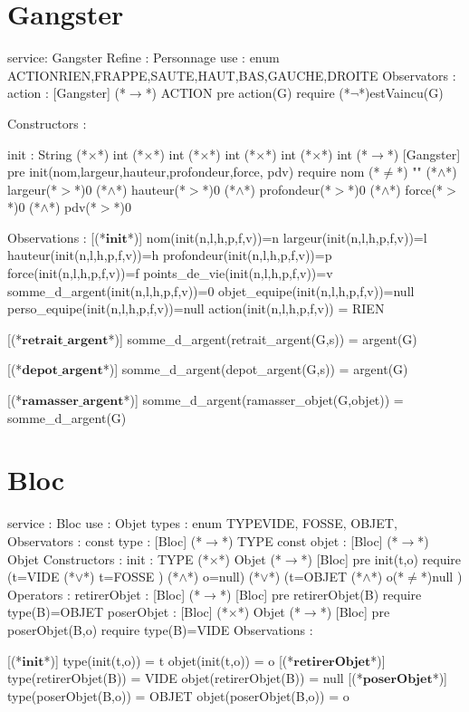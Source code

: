 \documentclass[a4paper, 11pt]{report}
\newcommand{\specB}[1]{\textbf{#1}}
\begin{document}
\section{Gangster}
\begin{Spe}
service: Gangster
Refine : Personnage
use : enum ACTION{RIEN,FRAPPE,SAUTE,HAUT,BAS,GAUCHE,DROITE}
Observators :
	action : [Gangster]  (*$\rightarrow$*) ACTION
		pre action(G) require (*$\lnot$*)estVaincu(G)
		
Constructors : 

	init : String (*$\times$*) int (*$\times$*) int (*$\times$*) int (*$\times$*) int (*$\times$*) int  (*$\rightarrow$*) [Gangster]
		pre init(nom,largeur,hauteur,profondeur,force, pdv) require nom (*$\neq$*) "" (*$\land$*) largeur(*$>$*)0 (*$\land$*) hauteur(*$>$*)0 (*$\land$*) profondeur(*$>$*)0 (*$\land$*) force(*$>$*)0 (*$\land$*) pdv(*$>$*)0 
		
Observations :
	[(*$\specB{init}$*)]
		nom(init(n,l,h,p,f,v))=n
		largeur(init(n,l,h,p,f,v))=l
		hauteur(init(n,l,h,p,f,v))=h
		profondeur(init(n,l,h,p,f,v))=p
		force(init(n,l,h,p,f,v))=f
		points_de_vie(init(n,l,h,p,f,v))=v
		somme_d_argent(init(n,l,h,p,f,v))=0
		objet_equipe(init(n,l,h,p,f,v))=null
		perso_equipe(init(n,l,h,p,f,v))=null
		action(init(n,l,h,p,f,v)) = RIEN
		
	[(*$\specB{retrait\_argent}$*)]
		somme_d_argent(retrait_argent(G,s)) = argent(G)
		
	[(*$\specB{depot\_argent}$*)]
		somme_d_argent(depot_argent(G,s)) = argent(G) 

	[(*$\specB{ramasser\_argent}$*)]
		somme_d_argent(ramasser_objet(G,objet)) = somme_d_argent(G)
					
\end{Spe}

\section{Bloc}
\begin{Spe}
service : Bloc
use : Objet
types : enum TYPE{VIDE, FOSSE, OBJET},
Observators :
      const type : [Bloc] (*$\rightarrow$*) TYPE
      const objet : [Bloc] (*$\rightarrow$*) Objet
Constructors :
      init : TYPE (*$\times$*) Objet (*$\rightarrow$*) [Bloc]
            pre init(t,o) require 
            (t=VIDE (*$\lor$*) t=FOSSE ) (*$\land$*) o=null) (*$\lor$*) (t=OBJET (*$\land$*) o(*$\ne$*)null ) 
Operators :
      retirerObjet : [Bloc] (*$\rightarrow$*) [Bloc]
            pre retirerObjet(B) require type(B)=OBJET
      poserObjet : [Bloc] (*$\times$*) Objet (*$\rightarrow$*) [Bloc]
            pre poserObjet(B,o) require type(B)=VIDE 
Observations :
     
      [(*$\specB{init}$*)]
            type(init(t,o)) = t
            objet(init(t,o)) = o
      [(*$\specB{retirerObjet}$*)]
            type(retirerObjet(B)) = VIDE
            objet(retirerObjet(B)) = null
      [(*$\specB{poserObjet}$*)] 
            type(poserObjet(B,o)) = OBJET
            objet(poserObjet(B,o)) = o 
     
\end{Spe}
 
\end{document}

